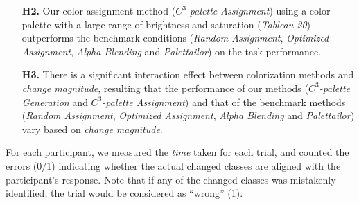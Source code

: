 {\begin{itemize}[noitemsep]
    \item [\textbf{H2.}] Our color assignment method (\emph{$C^3$-palette Assignment}) using a color palette with a large range of brightness and saturation (\emph{Tableau-20}) outperforms the benchmark conditions (\emph{Random Assignment}, \emph{Optimized Assignment}, \emph{Alpha Blending} and \emph{Palettailor}) on the task performance.

    \item [\textbf{H3.}] There is a significant interaction effect between colorization methods and \emph{change magnitude}, resulting that the performance of our methods (\emph{$C^3$-palette Generation} and \emph{$C^3$-palette Assignment}) and that of the benchmark methods (\emph{Random Assignment}, \emph{Optimized Assignment}, \emph{Alpha Blending} and \emph{Palettailor}) vary based on \emph{change magnitude}.
\end{itemize}

\vspace{.3em}
For each participant, we measured the \emph{time} taken for each trial, and counted the errors ($0/1$) indicating whether the actual changed classes are aligned with the participant's response. Note that if any of the changed classes was mistakenly identified, the trial would be considered as ``wrong'' (1).





}
